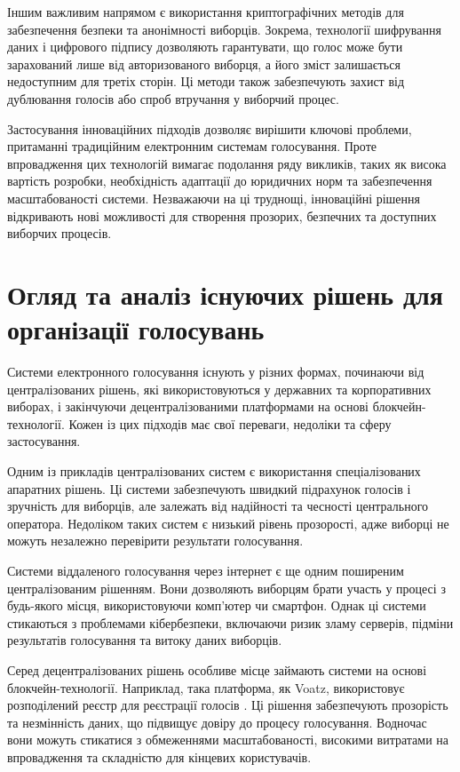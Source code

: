 \documentclass[14pt]{extreport}
\begin{document}
  Іншим важливим напрямом є використання криптографічних методів для забезпечення безпеки та анонімності виборців. Зокрема, технології шифрування даних і цифрового підпису дозволяють гарантувати, що голос може бути зарахований лише від авторизованого виборця, а його зміст залишається недоступним для третіх сторін. Ці методи також забезпечують захист від дублювання голосів або спроб втручання у виборчий процес.

  Застосування інноваційних підходів дозволяє вирішити ключові проблеми, притаманні традиційним електронним системам голосування. Проте впровадження цих технологій вимагає подолання ряду викликів, таких як висока вартість розробки, необхідність адаптації до юридичних норм та забезпечення масштабованості системи. Незважаючи на ці труднощі, інноваційні рішення відкривають нові можливості для створення прозорих, безпечних та доступних виборчих процесів.
  
  \section{Огляд та аналіз існуючих рішень для організації голосувань}
  
  Системи електронного голосування існують у різних формах, починаючи від централізованих рішень, які використовуються у державних та корпоративних виборах, і закінчуючи децентралізованими платформами на основі блокчейн-технології. Кожен із цих підходів має свої переваги, недоліки та сферу застосування.

  Одним із прикладів централізованих систем є використання спеціалізованих апаратних рішень. Ці системи забезпечують швидкий підрахунок голосів і зручність для виборців, але залежать від надійності та чесності центрального оператора. Недоліком таких систем є низький рівень прозорості, адже виборці не можуть незалежно перевірити результати голосування.

  Системи віддаленого голосування через інтернет є ще одним поширеним централізованим рішенням. Вони дозволяють виборцям брати участь у процесі з будь-якого місця, використовуючи комп’ютер чи смартфон. Однак ці системи стикаються з проблемами кібербезпеки, включаючи ризик зламу серверів, підміни результатів голосування та витоку даних виборців.

  Серед децентралізованих рішень особливе місце займають системи на основі блокчейн-технології. Наприклад, така платформа, як Voatz, використовує розподілений реєстр для реєстрації голосів \cite{voatz}. Ці рішення забезпечують прозорість та незмінність даних, що підвищує довіру до процесу голосування. Водночас вони можуть стикатися з обмеженнями масштабованості, високими витратами на впровадження та складністю для кінцевих користувачів.
\end{document}
